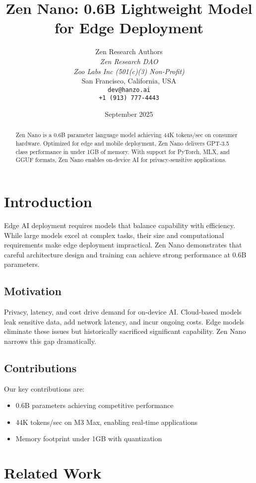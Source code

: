 \documentclass[11pt,a4paper]{article}
\title{Zen Nano: 0.6B Lightweight Model for Edge Deployment}
\author{
    Zen Research Authors \\
    \textit{Zen Research DAO} \\
    \textit{Zoo Labs Inc (501(c)(3) Non-Profit)} \\
    San Francisco, California, USA \\
    \texttt{dev@hanzo.ai} \\
    \texttt{+1 (913) 777-4443}
}
\date{September 2025}
\begin{document}
\maketitle

\begin{abstract}
Zen Nano is a 0.6B parameter language model achieving 44K tokens/sec on consumer hardware. Optimized for edge and mobile deployment, Zen Nano delivers GPT-3.5 class performance in under 1GB of memory. With support for PyTorch, MLX, and GGUF formats, Zen Nano enables on-device AI for privacy-sensitive applications.
\end{abstract}

\section{Introduction}

Edge AI deployment requires models that balance capability with efficiency. While large models excel at complex tasks, their size and computational requirements make edge deployment impractical. Zen Nano demonstrates that careful architecture design and training can achieve strong performance at 0.6B parameters.

\subsection{Motivation}
Privacy, latency, and cost drive demand for on-device AI. Cloud-based models leak sensitive data, add network latency, and incur ongoing costs. Edge models eliminate these issues but historically sacrificed significant capability. Zen Nano narrows this gap dramatically.

\subsection{Contributions}
Our key contributions are:
\begin{itemize}
    \item 0.6B parameters achieving competitive performance
    \item 44K tokens/sec on M3 Max, enabling real-time applications
    \item Memory footprint under 1GB with quantization
\end{itemize}

\section{Related Work}
\end{document}
